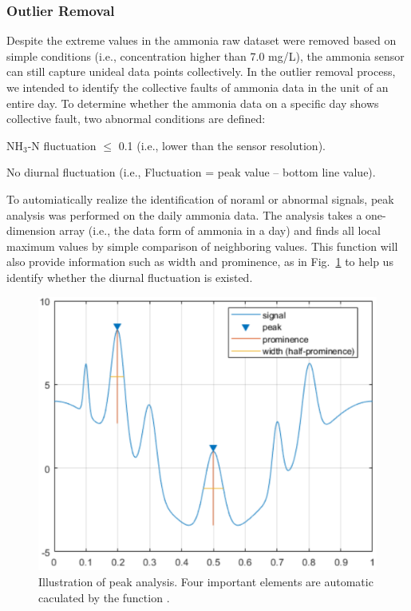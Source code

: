 \subsubsection{Outlier Removal}
Despite the extreme values in the ammonia raw dataset were removed based on simple conditions (i.e., concentration higher than 7.0 mg/L), the ammonia sensor can still capture unideal data points collectively. In the outlier removal process, we intended to identify the collective faults of ammonia data in the unit of an entire day. To determine whether the ammonia data on a specific day shows collective fault, two abnormal conditions are defined:

\noindent
\begin{myenumerate}
    \item NH$_{3}$-N fluctuation $\le$ 0.1 (i.e., lower than the sensor resolution).
    \item No diurnal fluctuation (i.e., Fluctuation = peak value – bottom line value).
\end{myenumerate}

To automiatically realize the identification of noraml or abnormal signals, peak analysis was performed on the daily ammonia data. The analysis takes a one-dimension array (i.e., the data form of ammonia in a day) and finds all local maximum values by simple comparison of neighboring values. This function will also provide information such as width and prominence, as in Fig.~\ref{fig:prominence} to help us identify whether the diurnal fluctuation is existed.

\begin{figure}[h]
    \centering
    \includegraphics[width=0.55\columnwidth]{imgs/pre-processing/prominence.png}
    \caption{Illustration of peak analysis. Four important elements are automatic caculated by the function \citep{mathworksDocumentationFindpeaks2022}.}
    \label{fig:prominence}
 \end{figure}

